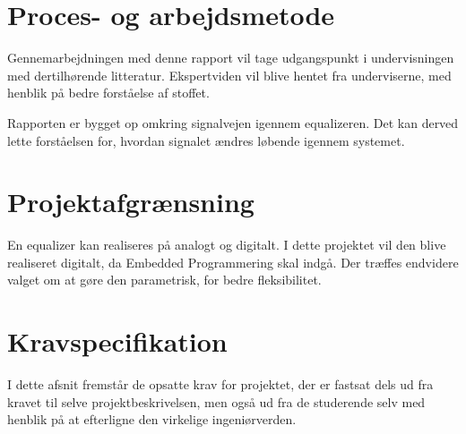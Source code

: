 
\section{Proces- og arbejdsmetode}

Gennemarbejdningen med denne rapport vil tage udgangspunkt i undervisningen med dertilhørende litteratur. Ekspertviden vil blive hentet fra underviserne, med henblik på bedre forståelse af stoffet.

Rapporten er bygget op omkring signalvejen igennem equalizeren. Det kan derved lette forståelsen for, hvordan signalet ændres løbende igennem systemet.


\section{Projektafgrænsning}

En equalizer kan realiseres på analogt og digitalt. I dette projektet vil den blive realiseret digitalt, da Embedded Programmering skal indgå. Der træffes endvidere valget om at gøre den parametrisk, for bedre fleksibilitet. 



\section{Kravspecifikation} \label{afs:kravspecifikation}
I dette afsnit fremstår de opsatte krav for projektet, der er fastsat dels ud fra kravet til selve projektbeskrivelsen, men også ud fra de studerende selv med henblik på at efterligne den virkelige ingeniørverden.

